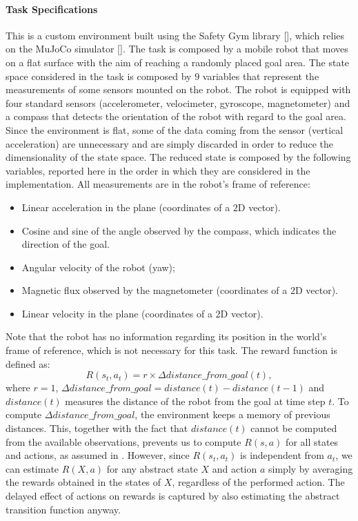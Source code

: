 \paragraph{Task Specifications}
This is a custom environment built using the Safety Gym library [\cite{ray2019benchmarking}], which relies on the MuJoCo simulator [\cite{todorov2012mujoco}]. The task is composed by a mobile robot that moves on a flat surface with the aim of reaching a randomly placed goal area. The state space considered in the task is composed by $9$ variables that represent the measurements of some sensors mounted on the robot. The robot is equipped with four standard sensors (accelerometer, velocimeter, gyroscope, magnetometer) and a compass that detects the orientation of the robot with regard to the goal area. Since the environment is flat, some of the data coming from the sensor (\eg vertical acceleration) are unnecessary and are simply discarded in order to reduce the dimensionality of the state space. 
The reduced state is composed by the following variables, reported here in the order in which they are considered in the implementation. All measurements are in the robot's frame of reference:
\begin{itemize}
	\item Linear acceleration in the plane (coordinates of a $2$D vector).
	\item Cosine and sine of the angle observed by the compass, which indicates the direction of the goal.
	\item Angular velocity of the robot (\wrt yaw);
	\item Magnetic flux observed by the magnetometer (coordinates of a $2$D vector).
	\item Linear velocity in the plane (coordinates of a $2$D vector).
\end{itemize}
Note that the robot has no information regarding its position in the world's frame of reference, which is not necessary for this task.
The reward function is defined as:
\[ 
R(s_t, a_t) = r \times \Delta distance\_from\_goal(t),
\]
where $r=1$, $\Delta distance\_from\_goal = distance(t) - distance(t-1)$ and $distance(t)$ measures the distance of the robot from the goal at time step $t$.
To compute $\Delta distance\_from\_goal$, the environment keeps a memory of previous distances. This, together with the fact that $distance(t)$ cannot be computed from the available observations, prevents us to compute $R(s,a)$ for all states and actions, as assumed in . However, since $R(s_t,a_t)$ is independent from $a_t$, we can estimate $R(X,a)$ for any abstract state $X$ and action $a$ simply by averaging the rewards obtained in the states of $X$, regardless of the performed action. The delayed effect of actions on rewards is captured by also estimating the abstract transition function anyway.
